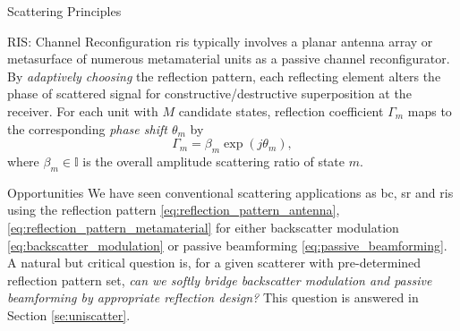 \documentclass[journal]{IEEEtran}
\begin{document}
\begin{section}{Scattering Principles}
	\begin{subsection}{RIS: Channel Reconfiguration}
		\gls{ris} typically involves a planar antenna array or metasurface of numerous metamaterial units as a passive channel reconfigurator.
		By \emph{adaptively choosing} the reflection pattern, each reflecting element alters the phase of scattered signal for constructive/destructive superposition at the receiver.
		For each unit with $M$ candidate states, reflection coefficient $\Gamma_m$ maps to the corresponding \emph{phase shift $\theta_m$} by
		\begin{equation}
			\Gamma_m = \beta_m \exp(j \theta_m),
			\label{eq:passive_beamforming}
		\end{equation}
		where $\beta_m \in \mathbb{I}$ is the overall amplitude scattering ratio of state $m$.
	\end{subsection}

	\begin{subsection}{Opportunities}
		We have seen conventional scattering applications as \gls{bc}, \gls{sr} and \gls{ris} using the reflection pattern \eqref{eq:reflection_pattern_antenna}, \eqref{eq:reflection_pattern_metamaterial} for either backscatter modulation \eqref{eq:backscatter_modulation} or passive beamforming \eqref{eq:passive_beamforming}.
		A natural but critical question is, for a given scatterer with pre-determined reflection pattern set, \emph{can we softly bridge backscatter modulation and passive beamforming by appropriate reflection design?}
		This question is answered in Section \ref{se:uniscatter}.
	\end{subsection}
\end{section}
\end{document}
